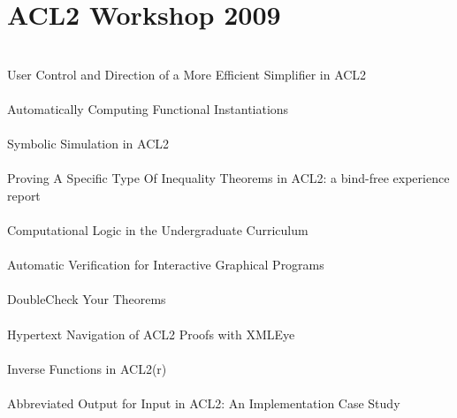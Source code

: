 \documentclass{article}
\begin{document}
\section{ACL2 Workshop 2009}

\cite{09-sumners-simplifier} \\
User Control and Direction of a More Efficient Simplifier in {ACL2} \\

\cite{09-moore-instantiations} \\
Automatically Computing Functional Instantiations \\

\cite{09-boyer-simulation} \\
Symbolic Simulation in {ACL2} \\

\cite{09-liu-inequality} \\
Proving A Specific Type Of Inequality Theorems in {ACL2}: a bind-free experience report \\

\cite{09-page-curriculum} \\
Computational Logic in the Undergraduate Curriculum \\

\cite{09-eastlund-interactive} \\
Automatic Verification for Interactive Graphical Programs \\

\cite{09-eastlund-doublecheck} \\
{DoubleCheck} Your Theorems \\

\cite{09-garcia-dominguez-xmleye} \\
Hypertext Navigation of {ACL2} Proofs with {XMLEye} \\

\cite{09-gamboa-inverse} \\
Inverse Functions in {ACL2(r)} \\

\cite{09-kaufmann-abbreviated} \\
Abbreviated Output for Input in {ACL2}: An Implementation Case Study \\
\end{document}

